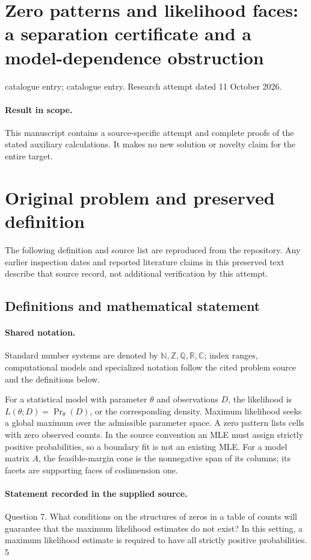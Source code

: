 \documentclass[11pt]{article}
\begin{document}
\section*{Zero patterns and likelihood faces: a separation certificate and a model-dependence obstruction}
\noindent catalogue entry; catalogue entry. Research attempt dated 11 October 2026.
\paragraph{Result in scope.}This manuscript contains a source-specific attempt and complete proofs of the stated auxiliary calculations. It makes no new solution or novelty claim for the entire target.
\section{Original problem and preserved definition}
The following definition and source list are reproduced from the repository. Any earlier inspection dates and reported literature claims in this preserved text describe that source record, not additional verification by this attempt.
\subsection{Definitions and mathematical statement}

\paragraph{Shared notation.}Standard number systems are denoted by $\mathbb N,\mathbb Z,\mathbb Q,\mathbb R,\mathbb C$; index ranges, computational models and specialized notation follow the cited problem source and the definitions below.


For a statistical model with parameter $\theta$ and observations $D$, the likelihood is $L(\theta;D)=\Pr_\theta(D)$, or the corresponding density. Maximum likelihood seeks a global maximum over the admissible parameter space. A zero pattern lists cells with zero observed counts. In the source convention an MLE must assign strictly positive probabilities, so a boundary fit is not an existing MLE. For a model matrix $A$, the feasible-margin cone is the nonnegative span of its columns; its facets are supporting faces of codimension one.
\paragraph{Statement recorded in the supplied source.}
Question 7. What conditions on the structures of zeros in a table of counts will guarantee that the maximum likelihood estimates do not exist? In this setting, a maximum likelihood estimate is required to have all strictly positive probabilities. 5
\end{document}
